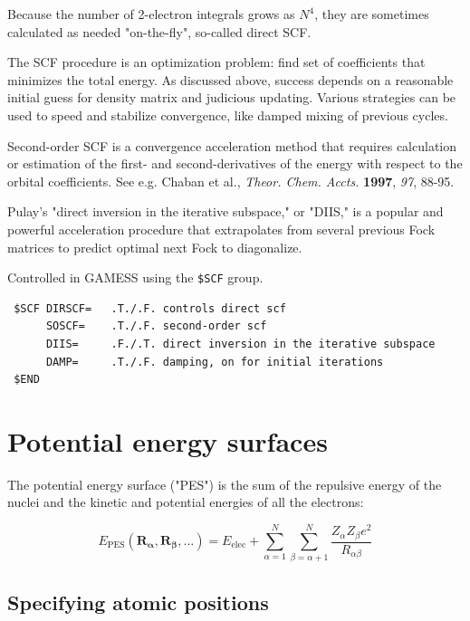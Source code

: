 \documentclass[11pt]{article}
\begin{document}
Because the number of 2-electron integrals grows as $N^4$, they are sometimes calculated as needed "on-the-fly", so-called direct SCF.

The SCF procedure is an optimization problem: find set of coefficients that minimizes the total energy. As discussed above, success depends on a reasonable initial guess for density matrix and judicious updating. Various strategies can be used to speed and stabilize convergence, like damped mixing of previous cycles.

Second-order SCF is a convergence acceleration method that requires calculation or estimation of the first- and second-derivatives of the energy with respect to the orbital coefficients. See e.g. Chaban et al., \emph{Theor. Chem. Accts.} \textbf{1997}, \emph{97}, 88-95.

Pulay's "direct inversion in the iterative subspace," or "DIIS," is a popular and powerful acceleration procedure that extrapolates from several previous Fock matrices to predict optimal next Fock to diagonalize.

Controlled in GAMESS using the \texttt{\$SCF} group.

\begin{verbatim}
 $SCF DIRSCF=   .T./.F. controls direct scf
      SOSCF=    .T./.F. second-order scf
      DIIS=     .F./.T. direct inversion in the iterative subspace
      DAMP=     .T./.F. damping, on for initial iterations
 $END
\end{verbatim}
\newpage
\section{Potential energy surfaces}
\label{sec-6}
The potential energy surface ("PES") is the sum of the repulsive energy of the nuclei and the kinetic and potential energies of all the electrons:
\begin{center}
\begin{equation}
E_\text{PES}(\mathbf{R_\alpha},\mathbf{R_\beta},\ldots) =E_\text{elec} +\sum_{\alpha=1}^N \sum_{\beta =\alpha +1}^N \frac{Z_\alpha Z_\beta e^2}{R_{\alpha \beta}}
\end{equation}
\end{center}

\subsection{Specifying atomic positions}
\label{sec-6-1}
\end{document}
